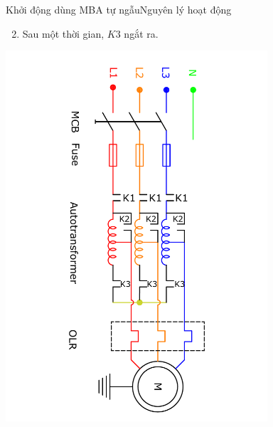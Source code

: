 \documentclass[17pt]{beamer}
\begin{document}
\begin{frame}{Khởi động dùng MBA tự ngẫu}{Nguyên lý hoạt động}
\begin{enumerate}
\setcounter{enumi}{1}
\item Sau một thời gian, $K3$ ngắt ra.
\end{enumerate}
\vspace{-2.5cm}
\begin{center}
\includegraphics[width = 0.73\textwidth,angle=90]{../sodomach/sodomach-bc-chude1-32.pdf}
\end{center}
\end{frame}
\end{document}
